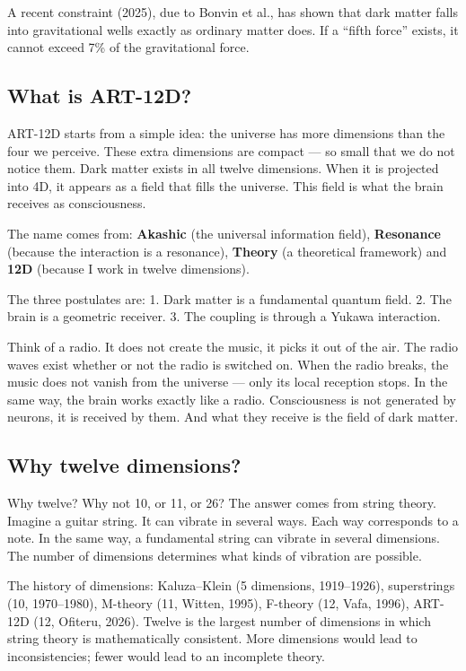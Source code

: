 \documentclass[11pt,a4paper]{article}
\begin{document}
A recent constraint (2025), due to Bonvin et al., has shown that dark matter falls into gravitational wells exactly as ordinary matter does. If a ``fifth force'' exists, it cannot exceed 7\% of the gravitational force.

\subsection{What is ART-12D?}
ART-12D starts from a simple idea: the universe has more dimensions than the four we perceive. These extra dimensions are compact --- so small that we do not notice them. Dark matter exists in all twelve dimensions. When it is projected into 4D, it appears as a field that fills the universe. This field is what the brain receives as consciousness.

The name comes from: \textbf{Akashic} (the universal information field), \textbf{Resonance} (because the interaction is a resonance), \textbf{Theory} (a theoretical framework) and \textbf{12D} (because I work in twelve dimensions).

The three postulates are: 1. Dark matter is a fundamental quantum field. 2. The brain is a geometric receiver. 3. The coupling is through a Yukawa interaction.

Think of a radio. It does not create the music, it picks it out of the air. The radio waves exist whether or not the radio is switched on. When the radio breaks, the music does not vanish from the universe --- only its local reception stops. In the same way, the brain works exactly like a radio. Consciousness is not generated by neurons, it is received by them. And what they receive is the field of dark matter.

\subsection{Why twelve dimensions?}
Why twelve? Why not 10, or 11, or 26? The answer comes from string theory. Imagine a guitar string. It can vibrate in several ways. Each way corresponds to a note. In the same way, a fundamental string can vibrate in several dimensions. The number of dimensions determines what kinds of vibration are possible.

The history of dimensions: Kaluza--Klein (5 dimensions, 1919--1926), superstrings (10, 1970--1980), M-theory (11, Witten, 1995), F-theory (12, Vafa, 1996), ART-12D (12, Ofiteru, 2026). Twelve is the largest number of dimensions in which string theory is mathematically consistent. More dimensions would lead to inconsistencies; fewer would lead to an incomplete theory.
\end{document}
